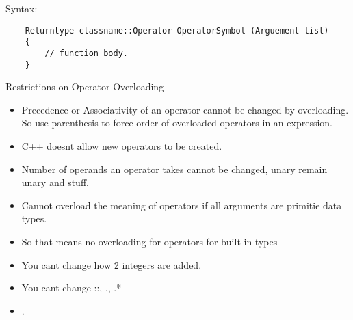 \documentclass[11pt]{article}
\begin{document}
Syntax: 
\begin{verbatim}
	Returntype classname::Operator OperatorSymbol (Arguement list)
	{
		// function body. 
	}
\end{verbatim}

Restrictions on Operator Overloading

\begin{itemize}
	\item Precedence or Associativity of an operator cannot be changed by overloading. So use parenthesis to force order of overloaded operators in an expression. 
	\item C++ doesnt allow new operators to be created. 
	\item Number of operands an operator takes cannot be changed, unary remain unary and stuff. 
	\item Cannot overload the meaning of operators if all arguments are primitie data types. 
	\item So that means no overloading for operators for built in types
	\item You cant change how 2 integers are added. 
	\item You cant change ::, ., .*
	\item .
\end{itemize}
\end{document}
